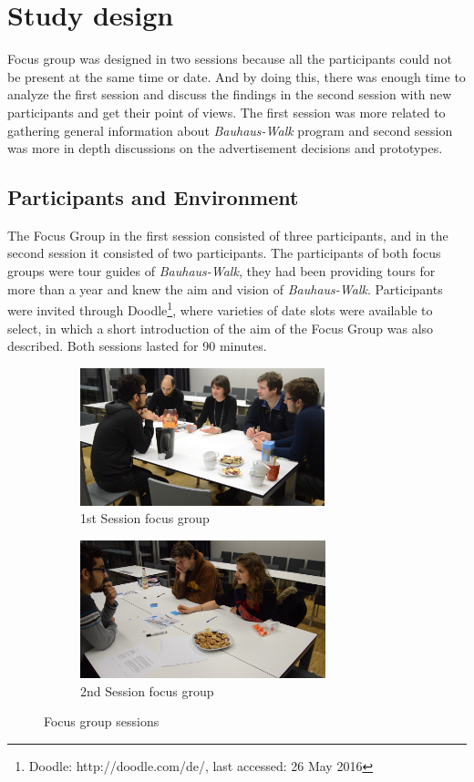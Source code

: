 \section{Study design}
Focus group was designed in two sessions because all the participants could not be present at the same time or date. And by doing this, there was enough time to analyze the first session and discuss the findings in the second session with new participants and get their point of views. The first session was more related to gathering general information about \emph{Bauhaus-Walk} program and second session was more in depth discussions on the advertisement decisions and prototypes.

\subsection{Participants and Environment}
The Focus Group in the first session consisted of three participants, and in the second session it consisted of two participants. The participants of both focus groups were tour guides of \emph{Bauhaus-Walk}, they had been providing tours for more than a year and knew the aim and vision of \emph{Bauhaus-Walk}. Participants were invited through Doodle\footnote{Doodle: http://doodle.com/de/, last accessed: 26 May 2016}, where varieties of date slots were available to select, in which a short introduction of the aim of the Focus Group was also described. Both sessions lasted for 90 minutes.


\begin{figure}[H]
    \centering
    \begin{subfigure}[H]{0.45\textwidth}
        \centering
        \includegraphics[width=\textwidth,height=4cm]{Figures/4/focus_group_s1}
        \caption{1st Session focus group }
        \label{fig:focus_group_s1}
    \end{subfigure}
    \begin{subfigure}[H]{0.45\textwidth}
        \centering
        \includegraphics[width=\textwidth,height=4cm]{Figures/4/focus_group_s2}
        \caption{2nd Session focus group}
        \label{fig:focus_group_s2}
    \end{subfigure}
    \caption{Focus group sessions}
    \label{fig:Focus_group_sessions}
\end{figure}

